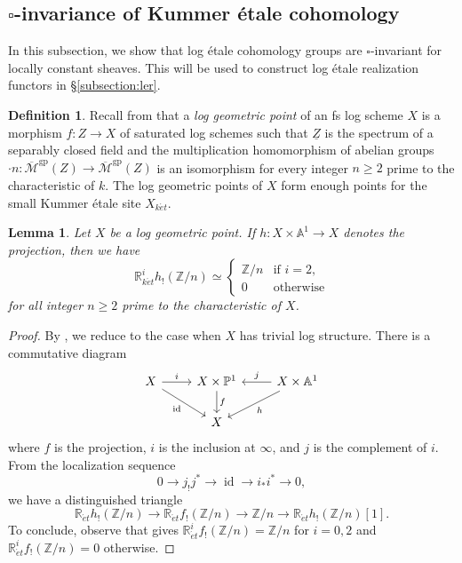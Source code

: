 \documentclass[11pt, a4paper]{amsart}
\newtheorem{lem}[thm]{Lemma}
\theoremstyle{definition}
\newtheorem{df}[thm]{Definition}
\numberwithin{equation}{subsection}
\newcommand{\Z}{\mathbb{Z}}
\newcommand{\R}{\mathbb{R}}
\renewcommand{\P}{\mathbb{P}}
\newcommand{\A}{\mathbb{A}}
\newcommand{\id}{\operatorname{id}}   			%
\newcommand{\ol}{\overline}
\renewcommand{\ul}{\underline}
\newcommand{\gp}{{\mathrm{gp}}}
\newcommand{\et}{{\acute{e}t}}
\newcommand{\ket}{{k\acute{e}t}}
\newcommand{\cM}{\mathcal{M}}
\newcommand{\boxx}{\square}
\begin{document}
\subsection{\texorpdfstring{$\boxx$-invariance}{Invariance} of Kummer \'etale cohomology}

In this subsection, 
we show that log \'etale cohomology groups are $\boxx$-invariant for locally constant sheaves.
This will be used to construct log \'etale realization functors in \S\ref{subsection:ler}.

\begin{df}
Recall from \cite[Definition 2.5]{MR1457738} that a \emph{log geometric point} 
of an fs log scheme $X$ is a morphism $f\colon Z\to X$ of saturated log schemes such that $\ul{Z}$ is the 
spectrum of a separably closed field and the multiplication homomorphism of abelian groups
$\cdot n \colon \ol{\cM}^{\gp}(Z)\to \ol{\cM}^{\gp}(Z)$ is an isomorphism for every integer $n\geq 2$ 
prime to the characteristic of $k$.
The log geometric points of $X$ form enough points for the small Kummer \'etale site $X_{\ket}$.
\end{df}

\begin{lem}
\label{ketreal.4}
Let $X$ be a log geometric point.
If $h\colon X\times \A^1\to X$ denotes the projection, then we have
\[
\R_{k\et}^i h_!( \Z/n)
\simeq
\left\{
\begin{array}{ll}
\Z/n &
\text{if }i=2,
\\
0 & \text{otherwise}
\end{array}
\right.
\]
for all integer $n\geq 2$ prime to the characteristic of $X$.
\end{lem}
\begin{proof}
By \cite[Paragraph 4.7(ii)]{MR1457738}, we reduce to the case when $X$ has trivial log structure.
There is a commutative diagram
\[
\begin{tikzcd}
X\ar[r,"i"]\ar[rd,"\id"']&
X\times \P^1\ar[d,"f"]&
X\times \A^1\ar[l,"j"']\arrow[ld,"h"]
\\
&
X
\end{tikzcd}
\]
where $f$ is the projection, $i$ is the inclusion at $\infty$, and $j$ is the complement of $i$.
From the localization sequence \cite[\S 2.8(4)]{MR1457738}
\[
0\to j_! j^* \to \id \to i_*i^* \to 0,
\]
we have a distinguished triangle
\[
\R_{\et} h_! (\Z/n) \to \R_{\et} f_! (\Z/n) \to \Z/n \to \R_{\et} h_! (\Z/n)[1].
\]
To conclude, 
observe that
\cite[Corollaire IX.4.7]{SGA4} gives $\R_{\et}^i f_!( \Z/n)=\Z/n$ for $i=0,2$ and $\R_{\et}^i f_!( \Z/n)=0$ otherwise.
\end{proof}
\end{document}
